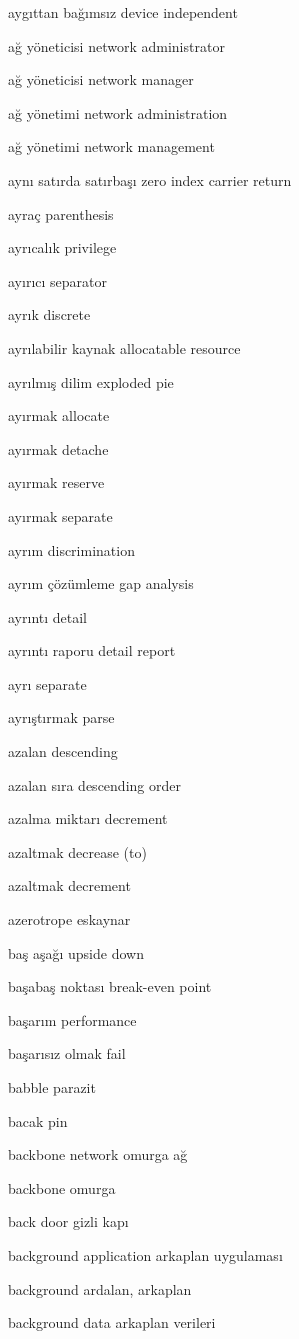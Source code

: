 \documentclass[12pt,fleqn]{article}\usepackage{../../common}
\begin{document}
aygıttan bağımsız device independent

ağ yöneticisi network administrator

ağ yöneticisi network manager

ağ yönetimi network administration

ağ yönetimi network management

aynı satırda satırbaşı zero index carrier return

ayraç parenthesis

ayrıcalık privilege

ayırıcı separator

ayrık discrete

ayrılabilir kaynak allocatable resource

ayrılmış dilim exploded pie

ayırmak allocate

ayırmak detache

ayırmak reserve

ayırmak separate

ayrım discrimination

ayrım çözümleme gap analysis

ayrıntı detail

ayrıntı raporu detail report

ayrı separate

ayrıştırmak parse

azalan descending

azalan sıra descending order

azalma miktarı decrement

azaltmak decrease (to)

azaltmak decrement

azerotrope eskaynar

baş aşağı upside down

başabaş noktası break-even point

başarım performance

başarısız olmak fail

babble parazit

bacak pin

backbone network omurga ağ

backbone omurga

back door gizli kapı

background application arkaplan uygulaması

background ardalan, arkaplan

background data arkaplan verileri
\end{document}
